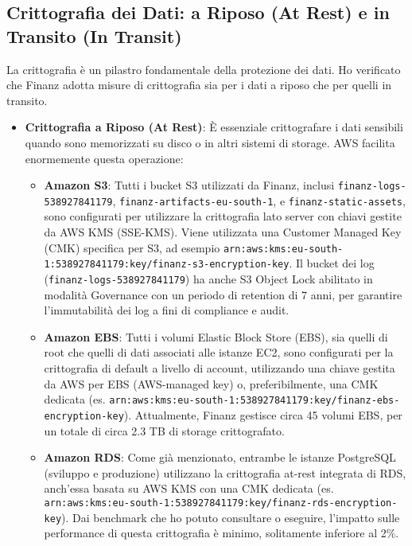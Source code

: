 \subsection{Crittografia dei Dati: a Riposo (At Rest) e in Transito (In Transit)}
\label{subsec:encryption_cap2}
La crittografia è un pilastro fondamentale della protezione dei dati. Ho verificato che Finanz adotta misure di crittografia sia per i dati a riposo che per quelli in transito.
\begin{itemize}
    \item \textbf{Crittografia a Riposo (At Rest)}: È essenziale crittografare i dati sensibili quando sono memorizzati su disco o in altri sistemi di storage. AWS facilita enormemente questa operazione:
        \begin{itemize}
            \item \textbf{Amazon S3}: Tutti i bucket S3 utilizzati da Finanz, inclusi \texttt{finanz-logs-538927841179}, \texttt{finanz-artifacts-eu-south-1}, e \texttt{finanz-static-assets}, sono configurati per utilizzare la crittografia lato server con chiavi gestite da AWS KMS (SSE-KMS). Viene utilizzata una Customer Managed Key (CMK) specifica per S3, ad esempio \texttt{arn:aws:kms:eu-south-1:538927841179:key/finanz-s3-encryption-key}. Il bucket dei log (\texttt{finanz-logs-538927841179}) ha anche S3 Object Lock abilitato in modalità Governance con un periodo di retention di 7 anni, per garantire l'immutabilità dei log a fini di compliance e audit.
            \item \textbf{Amazon EBS}: Tutti i volumi Elastic Block Store (EBS), sia quelli di root che quelli di dati associati alle istanze EC2, sono configurati per la crittografia di default a livello di account, utilizzando una chiave gestita da AWS per EBS (AWS-managed key) o, preferibilmente, una CMK dedicata (es. \texttt{arn:aws:kms:eu-south-1:538927841179:key/finanz-ebs-encryption-key}). Attualmente, Finanz gestisce circa 45 volumi EBS, per un totale di circa 2.3 TB di storage crittografato.
            \item \textbf{Amazon RDS}: Come già menzionato, entrambe le istanze PostgreSQL (sviluppo e produzione) utilizzano la crittografia at-rest integrata di RDS, anch'essa basata su AWS KMS con una CMK dedicata (es. \texttt{arn:aws:kms:eu-south-1:538927841179:key/finanz-rds-encryption-key}). Dai benchmark che ho potuto consultare o eseguire, l'impatto sulle performance di questa crittografia è minimo, solitamente inferiore al 2\%.
        \end{itemize}

\end{itemize}
